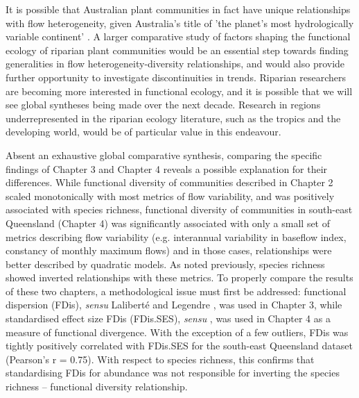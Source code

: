 \documentclass[openright,12pt,a4paper]{memoir}
\begin{document}
{{It is possible that Australian plant communities in fact have unique relationships with flow heterogeneity, given Australia's title of 'the planet’s most hydrologically variable continent' \citep{Peel2004, Rustomji2009}. A larger comparative study of factors shaping the functional ecology of riparian plant communities would be an essential step towards finding generalities in flow heterogeneity-diversity relationships, and would also provide further opportunity to investigate discontinuities in trends. Riparian researchers are becoming more interested in functional ecology, and it is possible that we will see global syntheses being made over the next decade. Research in regions underrepresented in the riparian ecology literature, such as the tropics and the developing world, would be of particular value in this endeavour.

Absent an exhaustive global comparative synthesis, comparing the specific findings of Chapter 3 and Chapter 4 reveals a possible explanation for their differences. While functional diversity of communities described in Chapter 2 scaled monotonically with most metrics of flow variability, and was positively associated with species richness, functional diversity of communities in south-east Queensland (Chapter 4) was significantly associated with only a small set of metrics describing flow variability (e.g. interannual variability in baseflow index, constancy of monthly maximum flows) and in those cases, relationships were better described by quadratic models. As noted previously, species richness showed inverted relationships with these metrics. To properly compare the results of these two chapters, a methodological issue must first be addressed: functional dispersion (FDis), \textit{sensu} Laliberté and Legendre \citep{Laliberte2010}, was used in Chapter 3, while standardised effect size FDis (FDis.SES), \textit{sensu} \citep{Mason2013}, was used in Chapter 4 as a measure of functional divergence. With the exception of a few outliers, FDis was tightly positively correlated with FDis.SES for the south-east Queensland dataset (Pearson's r = 0.75). With respect to species richness, this confirms that standardising FDis for abundance was not responsible for inverting the species richness – functional diversity relationship.

}}
\end{document}
